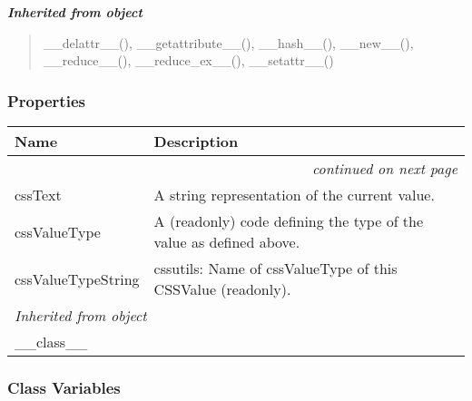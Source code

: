 \large{\textbf{\textit{Inherited from object}}}

\begin{quote}
\_\_delattr\_\_(), \_\_getattribute\_\_(), \_\_hash\_\_(), \_\_new\_\_(), \_\_reduce\_\_(), \_\_reduce\_ex\_\_(), \_\_setattr\_\_()
\end{quote}


  \subsubsection{Properties}

    \vspace{-1cm}
\hspace{\varindent}\begin{longtable}{|p{\varnamewidth}|p{\vardescrwidth}|l}
\cline{1-2}
\cline{1-2} \centering \textbf{Name} & \centering \textbf{Description}& \\
\cline{1-2}
\endhead\cline{1-2}\multicolumn{3}{r}{\small\textit{continued on next page}}\\\endfoot\cline{1-2}
\endlastfoot\raggedright c\-s\-s\-T\-e\-x\-t\- & \raggedright A string representation of the current value.&\\
\cline{1-2}
\raggedright c\-s\-s\-V\-a\-l\-u\-e\-T\-y\-p\-e\- & \raggedright A (readonly) code defining the type of the value as defined above.&\\
\cline{1-2}
\raggedright c\-s\-s\-V\-a\-l\-u\-e\-T\-y\-p\-e\-S\-t\-r\-i\-n\-g\- & \raggedright cssutils: Name of cssValueType of this CSSValue (readonly).&\\
\cline{1-2}
\multicolumn{2}{|l|}{\textit{Inherited from object}}\\
\multicolumn{2}{|p{\varwidth}|}{\raggedright \_\_class\_\_}\\
\cline{1-2}
\end{longtable}



  \subsubsection{Class Variables}

